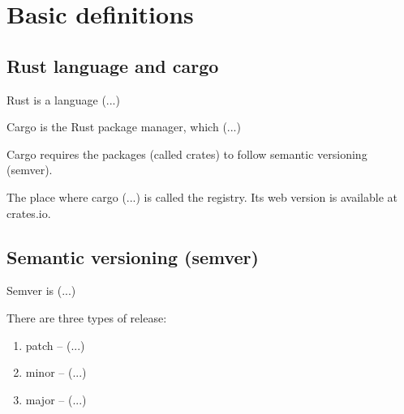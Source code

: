 \documentclass[licencjacka,en]{pracamgr}
\begin{document}




\chapter{Basic definitions}\label{r:definitions}

\section{Rust language and cargo}

Rust is a language (...)

Cargo is the Rust package manager, which (...)

Cargo requires the packages (called crates) to follow semantic versioning (semver).

The place where cargo (...) is called the registry.
Its web version is available at crates.io.


\section{Semantic versioning (semver)}

Semver is (...)

There are three types of release:
\begin{enumerate}
	\item patch -- (...)
	\item minor -- (...)
	\item major -- (...)
\end{enumerate}
\end{document}
